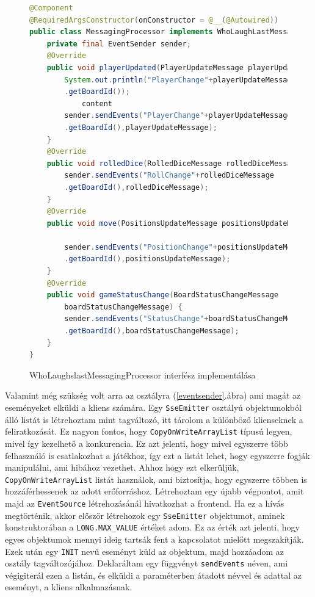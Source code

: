 \documentclass[a4paper,twoside]{article}
\begin{document}
\begin{figure}
	\caption{WhoLaughslastMessagingProcessor interfész implementálása}
	\begin{lstlisting}[language=java,breaklines=true]	
@Component
@RequiredArgsConstructor(onConstructor = @__(@Autowired))
public class MessagingProcessor implements WhoLaughLastMessagingProcessor{
	private final EventSender sender;
	@Override
	public void playerUpdated(PlayerUpdateMessage playerUpdateMessage) {
		System.out.println("PlayerChange"+playerUpdateMessage
		.getBoardId());
			content
		sender.sendEvents("PlayerChange"+playerUpdateMessage
		.getBoardId(),playerUpdateMessage);
	}
	@Override
	public void rolledDice(RolledDiceMessage rolledDiceMessage) {
		sender.sendEvents("RollChange"+rolledDiceMessage
		.getBoardId(),rolledDiceMessage);
	}
	@Override
	public void move(PositionsUpdateMessage positionsUpdateMessage) {
		
		sender.sendEvents("PositionChange"+positionsUpdateMessage
		.getBoardId(),positionsUpdateMessage);
	}
	@Override
	public void gameStatusChange(BoardStatusChangeMessage
		boardStatusChangeMessage) {
		sender.sendEvents("StatusChange"+boardStatusChangeMessage
		.getBoardId(),boardStatusChangeMessage);
	}
}
		\end{lstlisting}
		\label{messproc}
	\end{figure} 
	\FloatBarrier
Valamint még szükség volt arra az osztályra (\ref{eventsender}.ábra) ami magát az eseményeket elküldi a kliens számára.  Egy \verb|SseEmitter| osztályú objektumokból álló listát is létrehoztam mint tagváltozó, itt tárolom a különböző klienseknek a feliratkozását. Ez nagyon fontos, hogy \verb|CopyOnWriteArrayList| típusú legyen, mivel így kezelhető a konkurencia. Ez azt jelenti, hogy mivel egyszerre több felhasználó is csatlakozhat a játékhoz, így ezt a listát lehet, hogy egyszerre fogják manipulálni, ami hibához vezethet. Ahhoz hogy ezt elkerüljük, \verb|CopyOnWriteArrayList| listát használok, ami biztosítja, hogy egyszerre többen is hozzáférhessenek az adott erőforráshoz. Létrehoztam egy újabb végpontot, amit majd az \verb|EventSource| létrehozásánál hivatkozhat a frontend.  Ha ez a hívás megtörténik, akkor először létrehozok egy \verb|SseEmitter| objektumot, aminek konstruktorában a \verb|LONG.MAX_VALUE| értéket adom. Ez az érték azt jelenti, hogy egyes objektumok mennyi ideig tartsák fent a kapcsolatot mielőtt megszakítják. Ezek után egy \verb|INIT| nevű eseményt küld az objektum, majd hozzáadom az osztály tagváltozójához. Deklaráltam egy függvényt \verb|sendEvents| néven, ami végigiterál ezen a listán, és elküldi a paraméterben átadott névvel és adattal az eseményt, a kliens alkalmazásnak.
\end{document}
